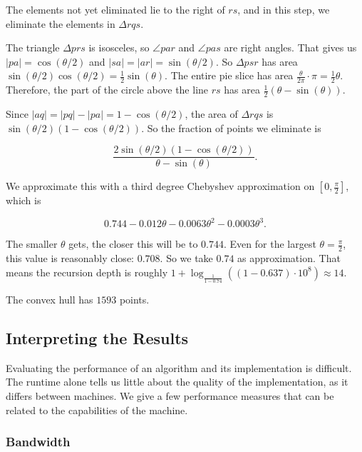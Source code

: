 The elements not yet eliminated lie to the right of $rs$, and in this step,
we eliminate the elements in $\Delta rqs$.

The triangle $\Delta prs$ is isosceles, so $\angle par$ and $\angle pas$
are right angles. That gives us $|pa| = \cos(\theta / 2)$ and 
$|sa| = |ar| = \sin(\theta / 2)$. So $\Delta psr$ has area 
$\sin(\theta / 2) \cos(\theta / 2) = \frac{1}{2} \sin(\theta)$. The entire
pie slice has area $\frac{\theta}{2 \pi} \cdot \pi = \frac{1}{2} \theta$.
Therefore, the part of the circle above the line $rs$ has area 
$\frac{1}{2}(\theta - \sin(\theta))$.

Since $|aq| = |pq| - |pa| = 1 - \cos(\theta / 2)$, the area of $\Delta rqs$
is $\sin(\theta / 2) (1 - \cos(\theta / 2))$. So the fraction of points we
eliminate is

$$\frac{2\sin(\theta / 2) (1 - \cos(\theta / 2))}{\theta - \sin(\theta)}.$$

We approximate this with a third degree Chebyshev approximation on 
$[0, \frac{\pi}{2}]$, which is

$$0.744 - 0.012 \theta - 0.0063 \theta^2 - 0.0003 \theta^3. $$

The smaller $\theta$ gets, the closer this will be to $0.744$. Even for the
largest $\theta = \frac{\pi}{2}$, this value is reasonably close: $0.708$. 
So we take $0.74$ as approximation. That means the recursion depth is roughly
$1 + \log_{\frac{1}{1 - 0.74}}((1 - 0.637) \cdot 10^8) \approx 14$.

The convex hull has $1593$ points.

\subsection{Interpreting the Results}

Evaluating the performance of an algorithm and its implementation is difficult.
The runtime alone tells us little about the quality of the implementation, as
it differs between machines. We give a few performance measures that can
be related to the capabilities of the machine.

\subsubsection{Bandwidth}

